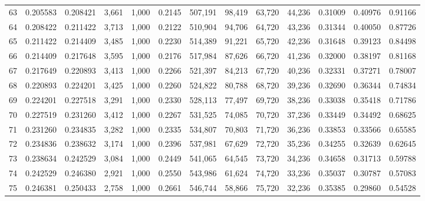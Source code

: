 \begin{tabular}{rrrrrrrrrrrrr}
63  &  0.205583 &  0.208421 &   3,661 &  1,000 &                                     0.2145 &  507,191 &   98,419 &   63,720 &   44,236 &  0.31009 &  0.40976 &  0.91166 \\
64  &  0.208422 &  0.211422 &   3,713 &  1,000 &                                     0.2122 &  510,904 &   94,706 &   64,720 &   43,236 &  0.31344 &  0.40050 &  0.87726 \\
65  &  0.211422 &  0.214409 &   3,485 &  1,000 &                                     0.2230 &  514,389 &   91,221 &   65,720 &   42,236 &  0.31648 &  0.39123 &  0.84498 \\
66  &  0.214409 &  0.217648 &   3,595 &  1,000 &                                     0.2176 &  517,984 &   87,626 &   66,720 &   41,236 &  0.32000 &  0.38197 &  0.81168 \\
67  &  0.217649 &  0.220893 &   3,413 &  1,000 &                                     0.2266 &  521,397 &   84,213 &   67,720 &   40,236 &  0.32331 &  0.37271 &  0.78007 \\
68  &  0.220893 &  0.224201 &   3,425 &  1,000 &                                     0.2260 &  524,822 &   80,788 &   68,720 &   39,236 &  0.32690 &  0.36344 &  0.74834 \\
69  &  0.224201 &  0.227518 &   3,291 &  1,000 &                                     0.2330 &  528,113 &   77,497 &   69,720 &   38,236 &  0.33038 &  0.35418 &  0.71786 \\
70  &  0.227519 &  0.231260 &   3,412 &  1,000 &                                     0.2267 &  531,525 &   74,085 &   70,720 &   37,236 &  0.33449 &  0.34492 &  0.68625 \\
71  &  0.231260 &  0.234835 &   3,282 &  1,000 &                                     0.2335 &  534,807 &   70,803 &   71,720 &   36,236 &  0.33853 &  0.33566 &  0.65585 \\
72  &  0.234836 &  0.238632 &   3,174 &  1,000 &                                     0.2396 &  537,981 &   67,629 &   72,720 &   35,236 &  0.34255 &  0.32639 &  0.62645 \\
73  &  0.238634 &  0.242529 &   3,084 &  1,000 &                                     0.2449 &  541,065 &   64,545 &   73,720 &   34,236 &  0.34658 &  0.31713 &  0.59788 \\
74  &  0.242529 &  0.246380 &   2,921 &  1,000 &                                     0.2550 &  543,986 &   61,624 &   74,720 &   33,236 &  0.35037 &  0.30787 &  0.57083 \\
75  &  0.246381 &  0.250433 &   2,758 &  1,000 &                                     0.2661 &  546,744 &   58,866 &   75,720 &   32,236 &  0.35385 &  0.29860 &  0.54528 \\

\end{tabular}
